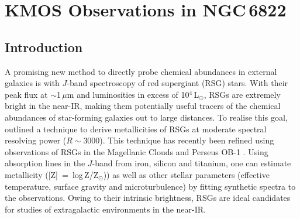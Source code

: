 \chapter{KMOS Observations in NGC\,6822}




\section{Introduction}

\label{sec:introduction}
A promising new method to directly probe chemical abundances in external galaxies is with $J$-band spectroscopy of red supergiant (RSG) stars.
With their peak flux at
$\sim$1\,$\mu$m and luminosities in excess of
10$^4$\,L$_\odot$, RSGs are extremely bright in the near-IR,
making them potentially useful tracers of the chemical abundances of star-forming galaxies out to large distances.
To realise this goal,
\cite{2010MNRAS.407.1203D} outlined a technique to derive metallicities of RSGs at moderate spectral resolving power
($R\sim$3000).
This technique has recently been refined using observations of RSGs in the Magellanic Clouds
\citep{Davies-prep} and Perseus OB-1
\citep{2014ApJ...788...58G}.
Using absorption lines in the $J$-band from iron, silicon and titanium, one can estimate metallicity
([Z]~=~log\,Z/Z$_{\odot}$)) as well as other stellar parameters
(effective temperature, surface gravity and microturbulence) by fitting synthetic spectra to the observations.
Owing to their intrinsic brightness,
RSGs are ideal candidates for studies of extragalactic environments in the near-IR.

